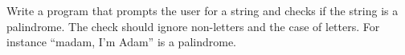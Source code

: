 Write a program that prompts the user for a string and checks if the string is a palindrome. The check should ignore non-letters and the case of letters. For instance ``madam, I'm Adam'' is a palindrome.

